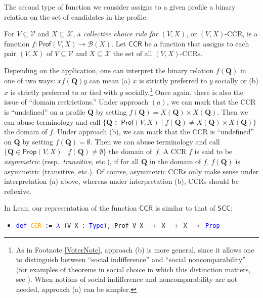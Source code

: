 \documentclass[runningheads]{llncs}
\begin{document}
The second type of function we consider assigns to a given profile a binary relation on the set of candidates in the profile. %

\begin{definition}\textnormal{For $V\subseteq\mathcal{V}$ and $X\subseteq\mathcal{X}$, a \textit{collective choice rule for $(V,X)$}, or $(V,X)$-CCR, is a function  $f: \mathsf{Prof}(V,X)\to \mathcal{B}(X)$. Let $\mathsf{CCR}$ be a function that assigns to each pair $(V,X)$ of $V\subseteq\mathcal{V}$ and $X\subseteq\mathcal{X}$ the set of all $(V,X)$-CCRs.}\end{definition}

\noindent Depending on the application, one can interpret the binary relation $f(\mathbf{Q})$ in one of two ways: $xf(\mathbf{Q})y$ can mean (a) $x$ is strictly preferred to $y$ socially or (b) $x$ is strictly preferred to or tied with $y$ socially.\footnote{As in Footnote \ref{VoterNote}, approach (b) is more general, since it allows one to distinguish between ``social indifference'' and ``social noncomparability'' (for examples of theorems in social choice in which this distinction matters, see \cite{HK2020}). When notions of social indifference and noncomparability are not needed, approach (a) can be simpler.} Once again, there is also the issue of ``domain restrictions.'' Under approach $(a)$, we can mark that the CCR is ``undefined'' on a profile $\mathbf{Q}$ by setting $f(\mathbf{Q})= X(\mathbf{Q})\times X(\mathbf{Q})$. Then we can abuse terminology and call $\{\mathbf{Q}\in\mathsf{Prof}(V,X)\mid f(\mathbf{Q})\neq X(\mathbf{Q})\times X(\mathbf{Q}) \}$ the domain of $f$. Under approach (b), we can mark that the CCR is ``undefined'' on $\mathbf{Q}$ by setting $f(\mathbf{Q})=\emptyset$. Then we can abuse terminology and call $\{\mathbf{Q}\in\mathsf{Prop}(V,X)\mid f(\mathbf{Q})\neq \emptyset\}$ the domain of~$f$.  A CCR $f$ is said to be \textit{asymmetric} (resp.~\textit{transitive}, etc.), if for all $\mathbf{Q}$ in the domain of $f$, $f(\mathbf{Q})$ is asymmetric (transitive, etc.). Of course, asymmetric CCRs only make sense under interpretation (a) above, whereas under interpretation (b), CCRs should be reflexive.

In Lean, our representation of the function $\mathsf{CCR}$ is similar to that of $\mathsf{SCC}$:
\begin{itemize}
\item[] \texttt{\textcolor{blue}{def} \textcolor{orange}{CCR} := \textcolor{blue}{$\lambda$} (V X : \textcolor{blue}{Type}), Prof V X $\to$ X $\to$ X $\to$ \textcolor{blue}{Prop}}
\end{itemize}
\end{document}
